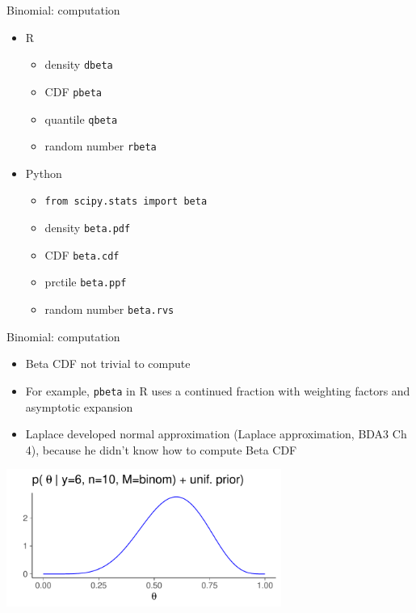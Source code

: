 \documentclass[english,t]{beamer}
\begin{document}
\begin{frame}{Binomial: computation}

  \begin{itemize}
  \item R
    \begin{itemize}
    \item density {\tt dbeta}
    \item CDF {\tt pbeta}
    \item quantile {\tt qbeta}
    \item random number {\tt rbeta}
    \end{itemize}
  \item Python
    \begin{itemize}
    \item {\tt from scipy.stats import beta}
    \item density {\tt beta.pdf}
    \item CDF {\tt beta.cdf}
    \item prctile {\tt beta.ppf}
    \item random number {\tt beta.rvs}
    \end{itemize}
  \end{itemize}

\end{frame}

\begin{frame}{Binomial: computation}

  \begin{itemize}
  \item Beta CDF not trivial to compute
  \item For example, {\tt pbeta} in R uses a continued fraction with
    weighting factors and asymptotic expansion
  \item Laplace developed normal approximation (Laplace
    approximation, BDA3 Ch 4), because he didn't know how to compute Beta CDF
  \end{itemize}

  \begin{center}
    {\includegraphics[width=9cm]{dbbeta10c.pdf}}
  \end{center}
  
\end{frame}
\end{document}
